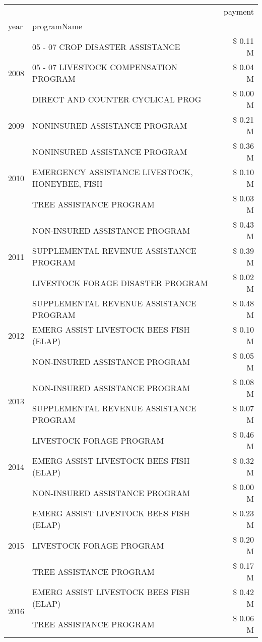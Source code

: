 \begin{tabular}{llr}
\toprule
 &  & payment \\
year & programName &  \\
\midrule
\multirow[t]{3}{*}{2008} & 05 - 07 CROP DISASTER ASSISTANCE & \$ 0.11 M \\
 & 05 - 07 LIVESTOCK COMPENSATION PROGRAM & \$ 0.04 M \\
 & DIRECT AND COUNTER CYCLICAL PROG & \$ 0.00 M \\
\cline{1-3}
2009 & NONINSURED ASSISTANCE PROGRAM & \$ 0.21 M \\
\cline{1-3}
\multirow[t]{3}{*}{2010} & NONINSURED ASSISTANCE PROGRAM & \$ 0.36 M \\
 & EMERGENCY ASSISTANCE LIVESTOCK, HONEYBEE, FISH & \$ 0.10 M \\
 & TREE ASSISTANCE PROGRAM & \$ 0.03 M \\
\cline{1-3}
\multirow[t]{3}{*}{2011} & NON-INSURED ASSISTANCE PROGRAM & \$ 0.43 M \\
 & SUPPLEMENTAL REVENUE ASSISTANCE PROGRAM & \$ 0.39 M \\
 & LIVESTOCK FORAGE DISASTER PROGRAM & \$ 0.02 M \\
\cline{1-3}
\multirow[t]{3}{*}{2012} & SUPPLEMENTAL REVENUE ASSISTANCE PROGRAM & \$ 0.48 M \\
 & EMERG ASSIST LIVESTOCK BEES FISH (ELAP) & \$ 0.10 M \\
 & NON-INSURED ASSISTANCE PROGRAM & \$ 0.05 M \\
\cline{1-3}
\multirow[t]{2}{*}{2013} & NON-INSURED ASSISTANCE PROGRAM & \$ 0.08 M \\
 & SUPPLEMENTAL REVENUE ASSISTANCE PROGRAM & \$ 0.07 M \\
\cline{1-3}
\multirow[t]{3}{*}{2014} & LIVESTOCK FORAGE PROGRAM & \$ 0.46 M \\
 & EMERG ASSIST LIVESTOCK BEES FISH (ELAP) & \$ 0.32 M \\
 & NON-INSURED ASSISTANCE PROGRAM & \$ 0.00 M \\
\cline{1-3}
\multirow[t]{3}{*}{2015} & EMERG ASSIST LIVESTOCK BEES FISH (ELAP) & \$ 0.23 M \\
 & LIVESTOCK FORAGE PROGRAM & \$ 0.20 M \\
 & TREE ASSISTANCE PROGRAM & \$ 0.17 M \\
\cline{1-3}
\multirow[t]{3}{*}{2016} & EMERG ASSIST LIVESTOCK BEES FISH (ELAP)       & \$ 0.42 M \\
 & TREE ASSISTANCE PROGRAM                       & \$ 0.06 M \\

\end{tabular}
